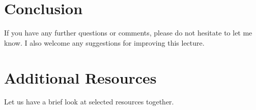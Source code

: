 \section{Conclusion}
If you have any further questions or comments, please do not hesitate to let me know. I also welcome any suggestions for improving this lecture.

\section{Additional Resources}
Let us have a brief look at selected resources together.





